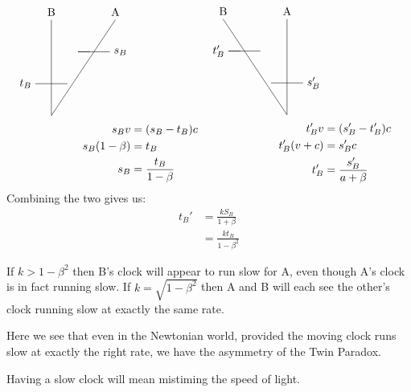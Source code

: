 \documentclass[a4paper]{report}
\begin{document}
\begin{equation*}
  \begin{aligned}[c]
    \begin{tikzpicture}
      \coordinate (A) at (0,0);
      \draw (A) -- +(0, 3) node[pos=1,above] {B};
      \draw (A) -- (2, 3) node[pos=0.666] (sa) {} node[pos=1,above] {A};
      \draw (-0.5, 1) node[left] {$t_B$} -- (0.5, 1);
      \draw (sa) -- +(-0.5, 0) -- +(0.5, 0) node[right] {$s_B$};
    \end{tikzpicture}\\
    s_Bv &=(s_B - t_B)c \\
s_B (1 - \beta) &=t_B \\
s_B & = \frac{t_B}{1 - \beta} 
  \end{aligned}
  \begin{aligned}[c]
    \begin{tikzpicture}
      \coordinate (RO) at (8,0);
      \draw (RO) -- +(0, 3) node[pos=1,above] {A};
      \draw (RO) -- +(-2, 3) node[pos=0.666] (tb) {} node[pos=1,above] {B};
      \draw (7.5, 1)  -- (8.5, 1) node[pos=1, right] {$s_B'$};
      \draw (tb) -- +(-0.5, 0) -- +(0.5, 0) node[pos=0, left] {$t_B'$};
    \end{tikzpicture} \\
    t_B' v&= (s_B'-t_B')c \\
    t_B'(v + c) &= s_B'c \\
t_B'&=\frac{s_B'}{a+\beta} 
  \end{aligned}
\end{equation*}
Combining the two gives us:
\begin{align*}
  t_B'&=\frac{kS_B}{1 + \beta} \\
&=\frac{kt_B}{1-\beta^2}
\end{align*}

If $k > 1 - \beta^2$ then B's clock will appear to run slow for A, even though A's clock is in fact running slow. If $k = \sqrt{1 - \beta^2}$ then A and B will each see the other's clock running slow at exactly the same rate.

Here we see that even in the Newtonian world, provided the moving clock runs slow at exactly the right rate, we have the asymmetry of the Twin Paradox.

Having a slow clock will mean mistiming the speed of light.

\end{document}
